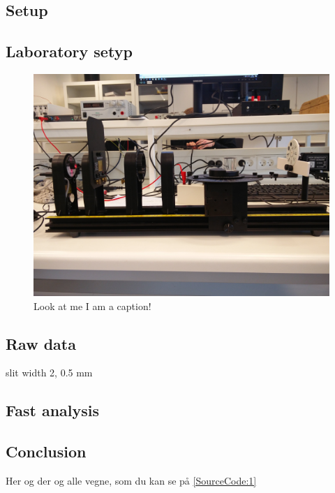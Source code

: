 \documentclass[a4paper, oneside, onecolumn, 11pt]{memoir}
\begin{document}
\subsection{Setup}

\subsection{Laboratory setyp}
\begin{figure}[h]
    \centering
    \includegraphics[width=\textwidth]{setup}
    \caption{Look at me I am a caption!}
\end{figure}

\subsection{Raw data}

slit width 2, 0.5 mm

\subsection{Fast analysis}

\subsection{Conclusion}
Her og der og alle vegne, som du kan se på \cref{SourceCode:1}
\end{document}

